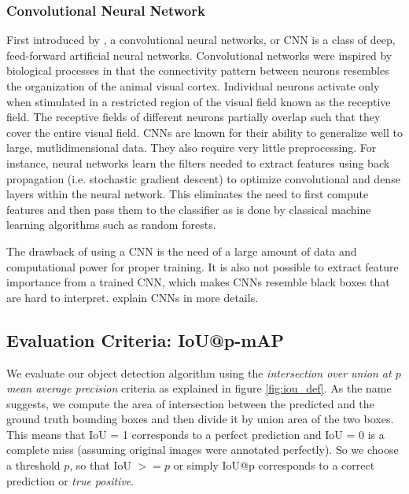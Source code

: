 		\subsubsection{Convolutional Neural Network}
			First introduced by \citep{AlexNet}, a convolutional neural networks, or CNN is a class of deep, feed-forward artificial neural networks. Convolutional networks were inspired by biological processes in that the connectivity pattern between neurons resembles the organization of the animal visual cortex. Individual neurons activate only when stimulated in a restricted region of the visual field known as the receptive field. The receptive fields of different neurons partially overlap such that they cover the entire visual field. CNNs are known for their ability to generalize well to large, mutlidimensional data. They also require very little preprocessing. For instance, neural networks learn the filters needed to extract features using back propagation (i.e. stochastic gradient descent) to optimize convolutional and dense layers within the neural network. This eliminates the need to first compute features and then pass them to the classifier as is done by classical machine learning algorithms such as random forests.
			
			The drawback of using a CNN is the need of a large amount of data and computational power for proper training. It is also not possible to extract feature importance from a trained CNN, which makes CNNs resemble black boxes that are hard to interpret.  
			 \citet{NNMethods} explain CNNs in more details.
		
		\subsection{Evaluation Criteria: IoU@p-mAP}
		  We evaluate our object detection algorithm using the \textit{intersection over union at $p$ mean average precision} criteria as explained in figure \ref{fig:iou_def}. As the  name suggests, we compute the area of intersection between the predicted and the ground truth bounding boxes and then divide it by union area of the two boxes. This means that IoU = 1 corresponds to a perfect prediction and IoU = 0 is a complete miss (assuming original images were annotated perfectly). So we choose a threshold $p$, so that IoU $>= p$ or simply IoU@p corresponds to a correct prediction or \textit{true positive}. 		  

